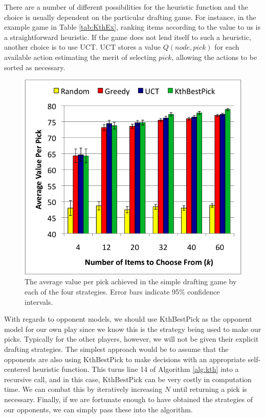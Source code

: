 \documentclass[letterpaper]{article}
\numberwithin{equation}{section}
\numberwithin{theorem}{section}
\numberwithin{lemma}{section}
\numberwithin{df}{section}
\begin{document}
There are a number of different possibilities for the heuristic function and the choice is usually dependent on the particular drafting game.  For instance, in the example game in Table \ref{tab:KthEx}, ranking items according to the value to us is a straightforward heuristic.  If the game does not lend itself to such a heuristic, another choice is to use UCT.  UCT stores a value $Q(node,pick)$ for each available action estimating the merit of selecting $pick$, allowing the actions to be sorted as necessary.

\begin{figure}[t]
	\centering
	\includegraphics[scale=0.55]{figs/TableDraftColor2.png}
	\caption{The average value per pick achieved in the simple drafting game by each of the four strategies.  Error bars indicate 95\% confidence intervals.}
	\label{fig:SimpleDraftGraph}
\end{figure}

With regards to opponent models, we should use KthBestPick as the opponent model for our own play since we know this is the strategy being used to make our picks.  Typically for the other players, however, we will not be given their explicit drafting strategies.  The simplest approach would be to assume that the opponents are also using KthBestPick to make decisions with an appropriate self-centered heuristic function.  This turns line 14 of Algorithm \ref{alg:kth} into a recursive call, and in this case, KthBestPick can be very costly in computation time.  We can combat this by iteratively increasing $N$ until returning a pick is necessary.  Finally, if we are fortunate enough to have obtained the strategies of our opponents, we can simply pass these into the algorithm.
\end{document}
